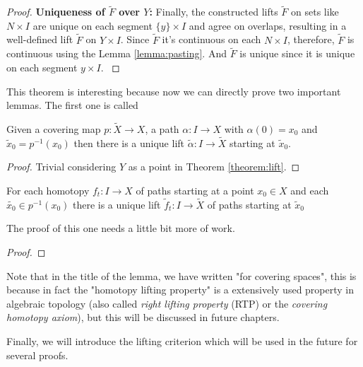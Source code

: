 \documentclass[12pt]{article}
\begin{document}
\begin{proof}
	\textbf{Uniqueness of \(\tilde{F}\) over \(Y\):} Finally, the constructed lifts $\tilde{F}$ on sets like $N \times I$ are unique on each segment $\{y\} \times I$ and agree on overlaps, resulting in a well-defined lift $\tilde{F}$ on $Y \times I$. Since $\tilde{F}$ it's continuous on each $N \times I$, therefore, $\tilde{F}$ is continuous using the Lemma \ref{lemma:pasting}. And \(\tilde{F}\) is unique since it is unique on each segment \({y} \times I\).
	\label{theorem:lift}
\end{proof}

This theorem is interesting because now we can directly prove two important lemmas. The first one is called

\begin{lemma}
	Given a covering map \(p : \tilde{X} \rightarrow X\), a path \(\alpha : I \rightarrow X\) with \(\alpha(0) = x_0\) and \(\tilde{x}_0 = p^{-1}(x_0)\) then there is a unique lift \(\tilde{\alpha} : I \rightarrow \tilde{X}\) starting at \(\tilde{x}_0\).
	\label{lemma:liftpath}
\end{lemma}

\begin{proof}
	Trivial considering \(Y\) as a point in Theorem \ref{theorem:lift}.
\end{proof}

\begin{lemma}
	For each homotopy \(f_t : I \rightarrow X\) of paths starting at a point \(x_0 \in X\) and each \(\tilde{x_0} \in p^{-1}(x_0)\) there is a unique lift \(\tilde{f}_t : I \rightarrow \tilde{X}\) of paths starting at \(\tilde{x}_0\)
	\label{lemma:lifthomotopy}
\end{lemma}

The proof of this one needs a little bit more of work. 

\begin{proof}

\end{proof}

Note that in the title of the lemma, we have written "for covering spaces", this is because in fact the "homotopy lifting property" is a extensively used property in algebraic topology (also called \textit{right lifting property} (RTP) or the \textit{covering homotopy axiom}), but this will be discussed in future chapters.

Finally, we will introduce the lifting criterion which will be used in the future for several proofs.
\end{document}
